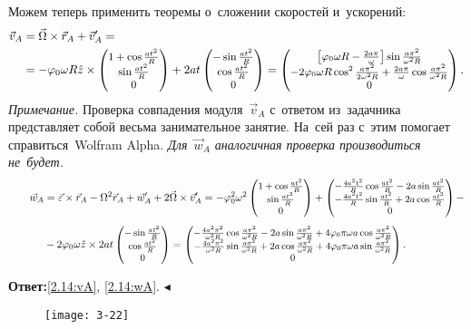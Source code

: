 \documentclass{weekly}
\begin{document}
Можем теперь применить теоремы о~сложении скоростей и~ускорений:
\begin{align}
\begin{split}
    \vec v_A &= \vec\Omega \times \vec r_A + \vec v'_A = \\
        &= -\varphi_0 \omega R \hat z \times
            \small\begin{pmatrix}1 + \cos\frac{at^2}{R}\\\sin\frac{at^2}{R}\\0\end{pmatrix} +
            2at \small\begin{pmatrix}-\sin\frac{at^2}{R}\\\cos\frac{at^2}{R}\\0\end{pmatrix}
        = \small\begin{pmatrix}\left[\varphi_0 \omega R -
            \frac{2a\pi}{\omega} \right]\sin\frac{a\pi^2}{\omega^2 R}\\-2\varphi_0 \omega R \cos^2\frac{a\pi^2}{2\omega^2 R} +
            \frac{2a\pi}{\omega} \cos\frac{a\pi^2}{\omega^2 R}\\0\end{pmatrix}.
        \label{2.14:vA}
\end{split}
\end{align}
\textsl{Примечание.} Проверка совпадения модуля~$\vec v_A$
с~ответом из~задачника представляет собой
весьма занимательное занятие. На~сей раз с~этим
помогает справиться~Wolfram Alpha. \emph{Для~$\vec w_A$
аналогичная проверка производиться не~будет.}
\begin{align}
\tag*{}
    \vec w_A &= \vec\varepsilon \times \vec r_A -
            \Omega^2 \vec r_A + \vec w_A' +
            2\vec\Omega \times \vec v_A'
        = - \varphi_0^2 \omega^2
            \small\begin{pmatrix}1 + \cos\frac{at^2}{R}\\\sin\frac{at^2}{R}\\0\end{pmatrix} +
            \small\begin{pmatrix}-\frac{4a^2 t^2}{R}\cos\frac{at^2}{R} -
            2a\sin\frac{at^2}{R}\\-\frac{4a^2 t^2}{R}\sin\frac{at^2}{R} +
            2a\cos\frac{at^2}{R}\\0\end{pmatrix} -\\[1ex]&-
            2\varphi_0 \omega \hat z \times
            2at \small\begin{pmatrix}-\sin\frac{at^2}{R}\\\cos\frac{at^2}{R}\\0\end{pmatrix}
        = \small\begin{pmatrix}-\frac{4a^2 \pi^2}{\omega^2 R}\cos\frac{a\pi^2}
                {\omega^2 R} - 2a\sin\frac{a\pi^2}{\omega^2 R} +
                4\varphi_0\pi\omega a \cos\frac{a\pi^2}{\omega^2 R}\\-\frac{4a^2 \pi^2}{\omega^2 R}\sin\frac{a\pi^2}
                {\omega^2 R} + 2a\cos\frac{a\pi^2}{\omega^2 R} +
                4\varphi_0\pi\omega a \sin\frac{a\pi^2}{\omega^2 R}\\0\end{pmatrix}. \label{2.14:wA}
\end{align}

\textbf{Ответ:}\quad \eqref{2.14:vA}, \eqref{2.14:wA}.
\hfill $\blacktriangleleft$


\begin{wrapfigure}[6]{r}{7cm}\vspace{-5.5mm}
    \texttt{[image: 3-22]}
\end{wrapfigure}
\end{document}
